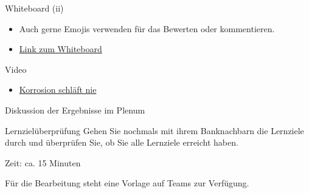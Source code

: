 \begin{frame}{Whiteboard (ii)}

    \begin{itemize}
        \item[\textbullet] Auch gerne Emojis verwenden für das Bewerten oder kommentieren.
        \item[\textbullet] \href{https://schweizerischebau-my.sharepoint.com/:wb:/g/personal/pfaendler_bauschule_ch/Ef9LEc4sPxROojf2Lq036s4BVeLmop9F0z6RdOGjloxprQ?e=k0avJg}{Link zum Whiteboard}
    \end{itemize}

\end{frame}


\begin{frame}{Video}
    \begin{itemize}
        \item \href{https://www.youtube.com/watch?v=h2Ez8dJto9s}{Korrosion schläft nie}
    \end{itemize}
\end{frame}


\begin{frame}{Diskussion der Ergebnisse im Plenum}

\end{frame}


\begin{frame}{Lernzielüberprüfung}
Gehen Sie nochmals mit ihrem Banknachbarn die Lernziele durch und überprüfen Sie, ob Sie alle Lernziele erreicht haben.


Zeit: ca. 15 Minuten


Für die Bearbeitung steht eine Vorlage auf Teams zur Verfügung.
\end{frame}


